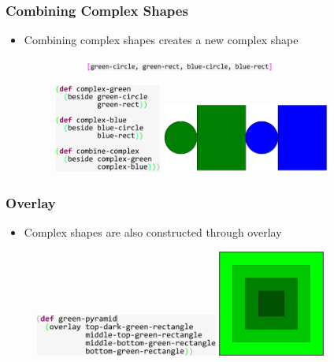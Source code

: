 \documentclass{beamer}
\begin{document}
\begin{frame}
\frametitle{Combining Complex Shapes}
	\begin{itemize}
		\item Combining complex shapes creates a new complex shape
		\begin{figure}
			\vspace{.5cm}
			\begin{figure}
				\hspace{3.7cm}
				\vspace{-.5cm}
				\includegraphics[width=6.2cm]{PresentationImages/complexStructure.pdf}
			\end{figure}
			\includegraphics[width=3.5cm]{PresentationImages/twoComplexCode.pdf}
			\hspace{0.3cm}
			\includegraphics[width=5.5cm]{PresentationImages/twoComplex.pdf}
		\end{figure}
	\end{itemize}
\end{frame}

\begin{frame}
\frametitle{Overlay}
	\begin{itemize}
		\item Complex shapes are also constructed through overlay
	\end{itemize}
	\begin{figure}
	\includegraphics[width=6cm]{PresentationImages/greenHoleCode.pdf}
	\hspace{1cm}
	\vspace{2cm}
	\includegraphics[width=3.5cm]{PresentationImages/greenHole.png}
	\end{figure}
\end{frame}
\end{document}
